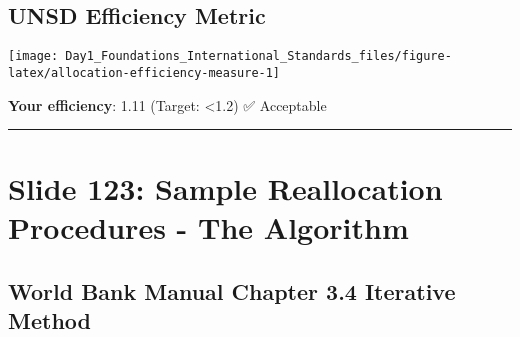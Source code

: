 \documentclass[
]{article}
\begin{document}
\subsection{UNSD Efficiency Metric}\label{unsd-efficiency-metric}

\texttt{[image: Day1\_Foundations\_International\_Standards\_files/figure-latex/allocation-efficiency-measure-1]}

\textbf{Your efficiency}: 1.11 (Target: \textless1.2) ✅ Acceptable

\begin{center}\rule{0.5\linewidth}{0.5pt}\end{center}

\section{Slide 123: Sample Reallocation Procedures - The
Algorithm}\label{slide-123-sample-reallocation-procedures---the-algorithm}

\subsection{World Bank Manual Chapter 3.4 Iterative
Method}\label{world-bank-manual-chapter-3.4-iterative-method}
\end{document}
